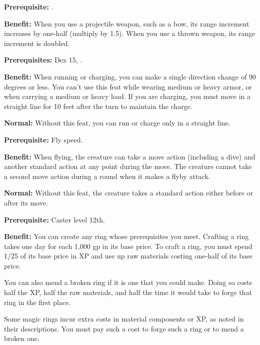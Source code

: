 
\textbf{Prerequisite:} .

\textbf{Benefit:} When you use a projectile weapon, such as a bow, its range increment 
increases by one-half (multiply by 1.5). When you use a thrown weapon, its range 
increment is doubled.


\textbf{Prerequisites:} Dex 15, .

\textbf{Benefit:} When running or charging, you can make a single direction change 
of 90 degrees or less. You can't use this feat while wearing medium or heavy armor, 
or when carrying a medium or heavy load.  If you are charging, you must move in 
a straight line for 10 feet after the turn to maintain the charge.

\textbf{Normal:} Without this feat, you can run or charge only in a straight line.



\textbf{Prerequisite:} Fly speed.

\textbf{Benefit:} When flying, the creature can take a move action (including a 
dive) and another standard action at any point during the move. The creature cannot 
take a second move action during a round when it makes a flyby attack.

\textbf{Normal:} Without this feat, the creature takes a standard action either 
before or after its move.


\textbf{Prerequisite:} Caster level 12th.

\textbf{Benefit:} You can create any ring whose prerequisites you meet. Crafting 
a ring takes one day for each 1,000 gp in its base price. To craft a ring, you 
must spend 1/25 of its base price in XP and use up raw materials costing one-half 
of its base price.

You can also mend a broken ring if it is one that you could make. Doing so costs 
half the XP, half the raw materials, and half the time it would take to forge that 
ring in the first place.

Some magic rings incur extra costs in material components or XP, as noted in their 
descriptions. You must pay such a cost to forge such a ring or to mend a broken 
one.


